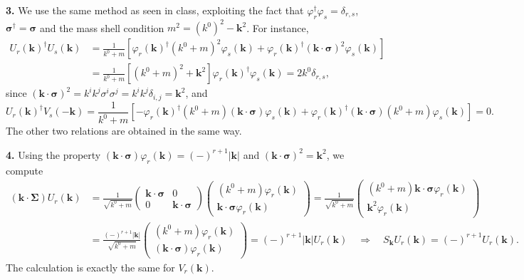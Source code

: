 \textbf{3.} We use the same method as seen in class, exploiting the fact that $\varphi^\dagger_r \varphi_s = \delta_{r,s}$, $\boldsymbol{\sigma}^\dagger = \boldsymbol{\sigma}$ and the mass shell condition $m^2 = (k^0)^2 - \mathbf{k}^2$. For instance,
\begin{equation}
\begin{aligned}
    U_r(\mathbf{k})^\dagger U_s(\mathbf{k}) &= \frac{1}{k^0+m} \left[ \varphi_r(\mathbf{k})^\dagger (k^0+m)^2 \varphi_s(\mathbf{k}) + \varphi_r(\mathbf{k})^\dagger (\mathbf{k}\cdot\boldsymbol{\sigma})^2 \varphi_s(\mathbf{k}) \right] \\
    &= \frac{1}{k^0+m} \left[ (k^0+m)^2 + \mathbf{k}^2 \right] \varphi_r(\mathbf{k})^\dagger \varphi_s(\mathbf{k}) = 2k^0 \delta_{r,s},
\end{aligned}
\end{equation}
since $(\mathbf{k}\cdot\boldsymbol{\sigma})^2 = k^i k^j \sigma^i \sigma^j = k^i k^j \delta_{i,j} = \mathbf{k}^2$, and
\begin{equation}
    U_r(\mathbf{k})^\dagger V_s(-\mathbf{k}) = \frac{1}{k^0+m} \left[ -\varphi_r(\mathbf{k})^\dagger (k^0+m)(\mathbf{k}\cdot\boldsymbol{\sigma}) \varphi_s(\mathbf{k}) + \varphi_r(\mathbf{k})^\dagger (\mathbf{k}\cdot\boldsymbol{\sigma})(k^0+m) \varphi_s(\mathbf{k}) \right] = 0.
\end{equation}
The other two relations are obtained in the same way.

\textbf{4.} Using the property $(\mathbf{k}\cdot\boldsymbol{\sigma})\varphi_r(\mathbf{k}) = (-)^{r+1}|\mathbf{k}|$ and $(\mathbf{k}\cdot\boldsymbol{\sigma})^2 = \mathbf{k}^2$, we compute
\begin{equation}
\begin{aligned}
    (\mathbf{k}\cdot\boldsymbol{\Sigma}) U_r(\mathbf{k}) &= \frac{1}{\sqrt{k^0+m}} \begin{pmatrix} \mathbf{k}\cdot\boldsymbol{\sigma} & 0 \\ 0 & \mathbf{k}\cdot\boldsymbol{\sigma} \end{pmatrix} \begin{pmatrix} (k^0+m)\varphi_r(\mathbf{k}) \\ \mathbf{k}\cdot\boldsymbol{\sigma}\varphi_r(\mathbf{k}) \end{pmatrix} = \frac{1}{\sqrt{k^0+m}} \begin{pmatrix} (k^0+m)\mathbf{k}\cdot\boldsymbol{\sigma}\varphi_r(\mathbf{k}) \\ \mathbf{k}^2\varphi_r(\mathbf{k}) \end{pmatrix} \\
    &= \frac{(-)^{r+1}|\mathbf{k}|}{\sqrt{k^0+m}} \begin{pmatrix} (k^0+m)\varphi_r(\mathbf{k}) \\ (\mathbf{k}\cdot\boldsymbol{\sigma})\varphi_r(\mathbf{k}) \end{pmatrix} = (-)^{r+1}|\mathbf{k}| U_r(\mathbf{k}) \quad \Rightarrow \quad S_{\mathbf{k}} U_r(\mathbf{k}) = (-)^{r+1} U_r(\mathbf{k}).
\end{aligned}
\end{equation}
The calculation is exactly the same for $V_r(\mathbf{k})$.

